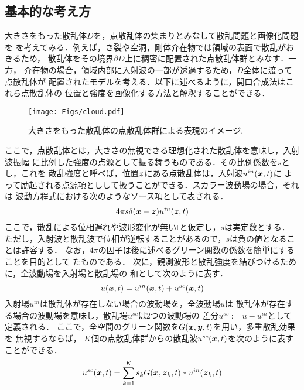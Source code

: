 \subsection{基本的な考え方}
大きさをもった散乱体$D$を，点散乱体の集まりとみなして散乱問題と画像化問題を
を考えてみる．例えば，き裂や空洞，剛体介在物では領域の表面で散乱がおきるため，
散乱体をその境界$\partial D$上に稠密に配置された点散乱体群とみなす．一方，
介在物の場合，領域内部に入射波の一部が透過するため，$D$全体に渡って点散乱体が
配置されたモデルを考える．以下に述べるように，開口合成法はこれら点散乱体の
位置と強度を画像化する方法と解釈することができる．
\begin{figure}[h]
	\begin{center}
	\texttt{[image: Figs/cloud.pdf]} 
	\end{center}
	\caption{大きさをもった散乱体の点散乱体群による表現のイメージ.} 
	\label{fig:XXX_cloud}
\end{figure}
ここで，点散乱体とは，大きさの無視できる理想化された散乱体を意味し，入射波振幅
に比例した強度の点源として振る舞うものである．その比例係数を$s$とし，これを
散乱強度と呼べば，位置$\mbox{\boldmath $z$}$にある点散乱体は，入射波$u^{in}(\mbox{\boldmath $x$},t)$に
よって励起される点源項としして扱うことができる．スカラー波動場の場合，それは
波動方程式における次のようなソース項として表される．
\begin{equation}
	4\pi s\delta (\mbox{\boldmath $x$}-\mbox{\boldmath $z$})u^{in}(\mbox{\boldmath $z$},t)
	\label{eqn:XXX_psct}
\end{equation}
ここで，散乱による位相遅れや波形変化が無いtと仮定し，$s$は実定数とする．
ただし，入射波と散乱波で位相が逆転することがあるので，$s$は負の値となることは許容する．
なお，$4\pi$の因子は後に述べるグリーン関数の係数を簡単にすることを目的として
たものである．
次に，観測波形と散乱強度を結びつけるために，全波動場を入射場と散乱場の
和として次のように表す．
\begin{equation}
	u(\mbox{\boldmath $x$},t)=u^{in}(\mbox{\boldmath $x$},t)+u^{sc}(\mbox{\boldmath $x$},t)
	\label{eqn:XXX_utot}
\end{equation}
入射場$u^{in}$は散乱体が存在しない場合の波動場を，全波動場$u$は
散乱体が存在する場合の波動場を意味し，散乱場$u^{sc}$は2つの波動場の
差分$u^{sc}:=u-u^{in}$として定義される．
ここで，全空間のグリーン関数を$G(\mbox{\boldmath $x$},\mbox{\boldmath $y$},t)$を用い，多重散乱効果を
無視するならば，
$K$個の点散乱体群からの散乱波$u^{sc}(\mbox{\boldmath $x$},t)$を次のように表すことができる．
\begin{equation}
	u^{sc}(\mbox{\boldmath $x$},t)=\sum_{k=1}^K s_k G(\mbox{\boldmath $x$},\mbox{\boldmath $z$}_k,t)*u^{in}(\mbox{\boldmath $z$}_k,t)
	\label{eqn:XXX_usc_G}
\end{equation}
